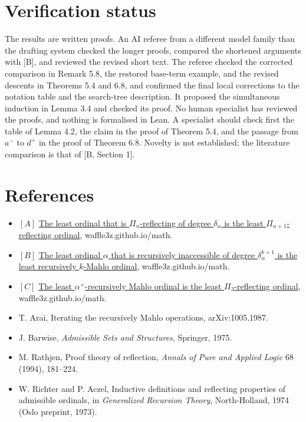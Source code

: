 \documentclass[11pt]{article}
\begin{document}
\section{Verification status}

The results are written proofs. An AI referee from a different model family than the drafting system checked the
longer proofs, compared the shortened arguments with [B], and reviewed the revised short text. The referee checked the
corrected comparison in Remark 5.8, the restored base-term example, and the revised descents in Theorems 5.4 and 6.8,
and confirmed the final local corrections to the notation table and the search-tree description. It proposed the
simultaneous induction in Lemma 3.4 and checked its proof. No human specialist has reviewed the proofs, and nothing is formalised in Lean. A specialist should check first the table of Lemma 4.2, the claim in the proof of Theorem
5.4, and the passage from $a^-$ to $d^+$ in the proof of Theorem 6.8. Novelty is not established; the literature
comparison is that of [B, Section 1].

\section*{References}

\begin{itemize}
\item $[A]$ \href{https://waffle3z.github.io/math/degree-reflection.html}{The least ordinal that is $\Pi_n$-reflecting of
  degree $\delta_\alpha$ is the least $\Pi_{n+1}$-reflecting ordinal}, waffle3z.github.io/math.
\item $[B]$ \href{https://waffle3z.github.io/math/degree-higher.html}{The least ordinal $\alpha$ that is recursively
  inaccessible of degree $\delta_\alpha^{k+1}$ is the least recursively $k$-Mahlo ordinal}, waffle3z.github.io/math.
\item $[C]$ \href{https://waffle3z.github.io/math/greatly-mahlo-pi3.html}{The least $\alpha^+$-recursively Mahlo ordinal
  is the least $\Pi_3$-reflecting ordinal}, waffle3z.github.io/math.
\item T. Arai, Iterating the recursively Mahlo operations, arXiv:1005.1987.
\item J. Barwise, \emph{Admissible Sets and Structures}, Springer, 1975.
\item M. Rathjen, Proof theory of reflection, \emph{Annals of Pure and Applied Logic} 68 (1994), 181--224.
\item W. Richter and P. Aczel, Inductive definitions and reflecting properties of admissible ordinals, in
  \emph{Generalized Recursion Theory}, North-Holland, 1974 (Oslo preprint, 1973).
\end{itemize}
\end{document}
